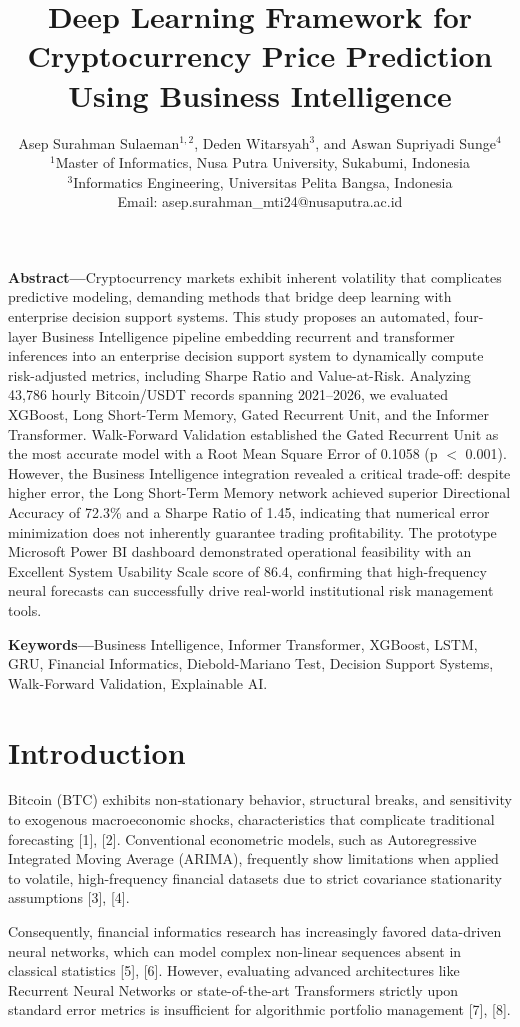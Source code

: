 \documentclass[10pt,a4paper]{article}
\title{\vspace{-1cm}\fontsize{16}{19}\bfseries Deep Learning Framework for Cryptocurrency Price Prediction Using Business Intelligence}
\author{\fontsize{10}{12}\selectfont Asep Surahman Sulaeman$^{1,2}$, Deden Witarsyah$^3$, and Aswan Supriyadi Sunge$^4$ \\
\fontsize{8}{10}\selectfont $^1$Master of Informatics, Nusa Putra University, Sukabumi, Indonesia \\
\fontsize{8}{10}\selectfont $^3$Informatics Engineering, Universitas Pelita Bangsa, Indonesia \\
\fontsize{8}{10}\selectfont Email: asep.surahman\_mti24@nusaputra.ac.id}
\date{}
\begin{document}
\maketitle

\vspace{-0.5cm}
\noindent\textbf{Abstract—}Cryptocurrency markets exhibit inherent volatility that complicates predictive modeling, demanding methods that bridge deep learning with enterprise decision support systems. This study proposes an automated, four-layer Business Intelligence pipeline embedding recurrent and transformer inferences into an enterprise decision support system to dynamically compute risk-adjusted metrics, including Sharpe Ratio and Value-at-Risk. Analyzing 43,786 hourly Bitcoin/USDT records spanning 2021–2026, we evaluated XGBoost, Long Short-Term Memory, Gated Recurrent Unit, and the Informer Transformer. Walk-Forward Validation established the Gated Recurrent Unit as the most accurate model with a Root Mean Square Error of 0.1058 (p $<$ 0.001). However, the Business Intelligence integration revealed a critical trade-off: despite higher error, the Long Short-Term Memory network achieved superior Directional Accuracy of 72.3\% and a Sharpe Ratio of 1.45, indicating that numerical error minimization does not inherently guarantee trading profitability. The prototype Microsoft Power BI dashboard demonstrated operational feasibility with an Excellent System Usability Scale score of 86.4, confirming that high-frequency neural forecasts can successfully drive real-world institutional risk management tools.

\vspace{0.3cm}
\noindent\textbf{Keywords—}Business Intelligence, Informer Transformer, XGBoost, LSTM, GRU, Financial Informatics, Diebold-Mariano Test, Decision Support Systems, Walk-Forward Validation, Explainable AI.

\section{Introduction}
Bitcoin (BTC) exhibits non-stationary behavior, structural breaks, and sensitivity to exogenous macroeconomic shocks, characteristics that complicate traditional forecasting [1], [2]. Conventional econometric models, such as Autoregressive Integrated Moving Average (ARIMA), frequently show limitations when applied to volatile, high-frequency financial datasets due to strict covariance stationarity assumptions [3], [4].

Consequently, financial informatics research has increasingly favored data-driven neural networks, which can model complex non-linear sequences absent in classical statistics [5], [6]. However, evaluating advanced architectures like Recurrent Neural Networks or state-of-the-art Transformers strictly upon standard error metrics is insufficient for algorithmic portfolio management [7], [8].
\end{document}
